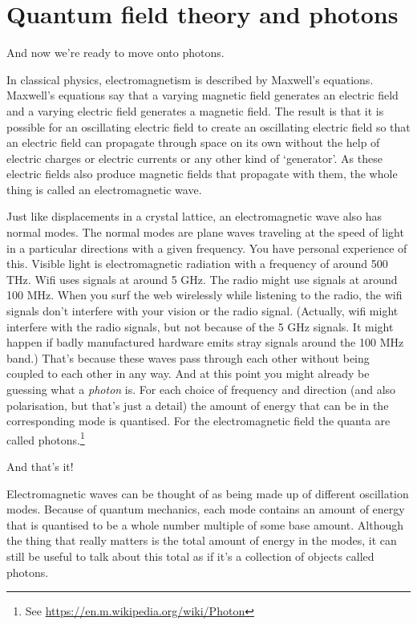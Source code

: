 \documentclass[a4paper]{article}
\begin{document}
\section{Quantum field theory and photons}
And now we're ready to move onto photons.

In classical physics, electromagnetism is described by Maxwell's equations.
Maxwell's equations say that a varying magnetic field generates an electric field and a varying electric field generates a magnetic field.
The result is that it is possible for an oscillating electric field to create an oscillating electric field so that an electric field can propagate through space on its own without the help of electric charges or electric currents or any other kind of `generator'.
As these electric fields also produce magnetic fields that propagate with them, the whole thing is called an electromagnetic wave.

Just like displacements in a crystal lattice, an electromagnetic wave also has normal modes.
The normal modes are plane waves traveling at the speed of light in a particular directions with a given frequency.
You have personal experience of this.
Visible light is electromagnetic radiation with a frequency of around 500 THz.
Wifi uses signals at around 5 GHz.
The radio might use signals at around 100 MHz.
When you surf the web wirelessly while listening to the radio, the wifi signals don't interfere with your vision or the radio signal.
(Actually, wifi might interfere with the radio signals, but not because of the 5 GHz signals. It might happen if badly manufactured hardware emits stray signals around the 100 MHz band.)
That's because these waves pass through each other without being coupled to each other in any way.
And at this point you might already be guessing what a {\em photon} is.
For each choice of frequency and direction (and also polarisation, but that's just a detail) the amount of energy that can be in the corresponding mode is quantised.
For the electromagnetic field the quanta are called photons.\footnote{See \url{https://en.m.wikipedia.org/wiki/Photon}}

And that's it!

Electromagnetic waves can be thought of as being made up of different oscillation modes.
Because of quantum mechanics, each mode contains an amount of energy that is quantised to be a whole number multiple of some base amount.
Although the thing that really matters is the total amount of energy in the modes, it can still be useful to talk about this total as if it's a collection of objects called photons.
\end{document}
